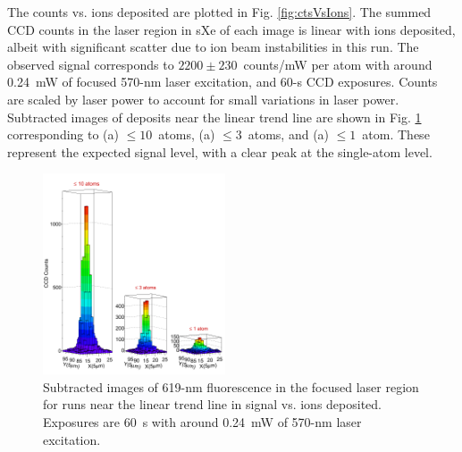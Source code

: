 \documentclass[aps,pra,reprint,superscriptaddress]{revtex4-1}
\begin{document}
The counts vs. ions deposited are plotted in Fig. \ref{fig:ctsVsIons}.  The summed CCD counts in the laser region in sXe of each image is linear with ions deposited, albeit with significant scatter due to ion beam instabilities in this run.  The observed signal corresponds to $2200 \pm 230$~counts/mW per atom with around 0.24~mW of focused 570-nm laser excitation, and 60-s CCD exposures.  Counts are scaled by laser power to account for small variations in laser power.  Subtracted images of deposits near the linear trend line are shown in Fig. \ref{fig:train} corresponding to (a) $\leq 10$~atoms, (a) $\leq 3$~atoms, and (a) $\leq 1$~atom.  These represent the expected signal level, with a clear peak at the single-atom level.



\begin{figure}
\includegraphics[width=0.48\textwidth]{figures/lego_train_fromthesis.png}
\caption{Subtracted images of 619-nm fluorescence in the focused laser region for runs near the linear trend line in signal vs. ions deposited.  Exposures are 60~s with around 0.24~mW of 570-nm laser excitation.}
\label{fig:train}
\end{figure}
\end{document}
